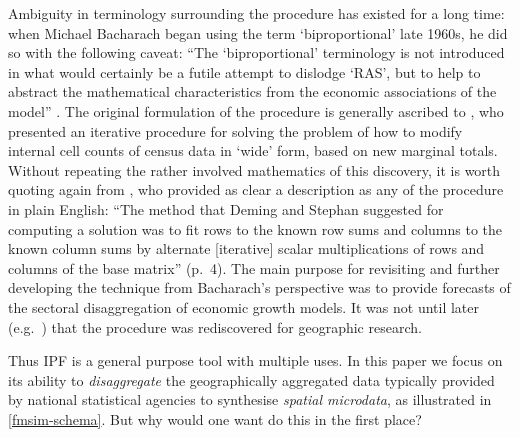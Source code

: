 \documentclass[a4paper,10pt]{article}
\begin{document}
Ambiguity in terminology surrounding the procedure has existed for a long time:
when Michael Bacharach began using the term `biproportional' late 1960s, he did so with the
following caveat: ``The `biproportional' terminology is not introduced in what
would certainly be a futile attempt to dislodge `RAS', but to help to abstract the
mathematical characteristics from the economic associations of the model'' \citep{bacharach1970biproportional}.
The original formulation of the procedure is generally ascribed to \citet{Deming1940},
who presented an iterative procedure for solving the problem of how to modify internal cell counts
of census data in `wide' form, based on new marginal totals. Without repeating
the rather involved mathematics of this discovery, it is worth quoting again from
\citet{bacharach1970biproportional}, who provided as clear a description as any of the procedure
in plain English: ``The method that Deming and Stephan suggested for
computing a solution was to fit rows to the known row sums and columns to the known
column sums by alternate [iterative] scalar multiplications of rows and columns of the
base matrix'' (p.~4). The main purpose for revisiting and further developing the technique
from Bacharach's perspective was to provide forecasts of the sectoral disaggregation of
economic growth models. It was not until later
(e.g.~\citealp{Holm1987}) that the procedure was rediscovered for geographic research.

Thus IPF is a general purpose tool with multiple uses. In this paper we focus on its
ability to \emph{disaggregate} the geographically aggregated data typically
provided by national statistical agencies to synthesise \emph{spatial microdata},
as illustrated in \cref{fmsim-schema}. But why would one want do this in the first place?

\end{document}
